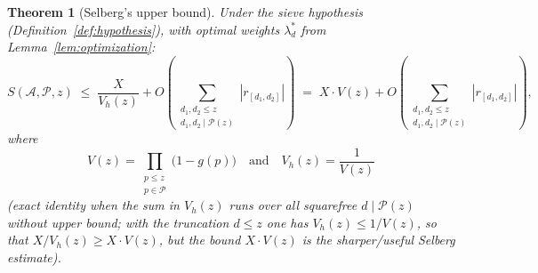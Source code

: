 \documentclass[12pt,a4paper]{amsart}
\newtheorem{theorem}{Theorem}[section]
\theoremstyle{definition}
\begin{document}
\begin{theorem}[Selberg's upper bound]\label{thm:selberg_main}
  Under the sieve hypothesis (Definition~\ref{def:hypothesis}), with
  optimal weights $\lambda_d^*$ from Lemma~\ref{lem:optimization}:
  \[
    S(\mathcal{A}, \mathcal{P}, z)
    \;\leq\; \frac{X}{V_h(z)}
             + O\!\left(\sum_{\substack{d_1, d_2 \leq z \\ d_1,d_2 \mid \mathcal{P}(z)}} |r_{[d_1,d_2]}|\right)
    \;=\; X \cdot V(z)
             + O\!\left(\sum_{\substack{d_1, d_2 \leq z \\ d_1,d_2 \mid \mathcal{P}(z)}} |r_{[d_1,d_2]}|\right),
  \]
  where
  \[
    V(z) = \prod_{\substack{p \leq z \\ p \in \mathcal{P}}} \bigl(1 - g(p)\bigr)
    \quad\text{and}\quad
    V_h(z) = \frac{1}{V(z)}
  \]
  (exact identity when the sum in $V_h(z)$ runs over all squarefree $d \mid \mathcal{P}(z)$
  without upper bound; with the truncation $d \leq z$ one has $V_h(z) \leq 1/V(z)$,
  so that $X/V_h(z) \geq X \cdot V(z)$, but the bound $X \cdot V(z)$ is the
  sharper/useful Selberg estimate).
\end{theorem}
\end{document}
